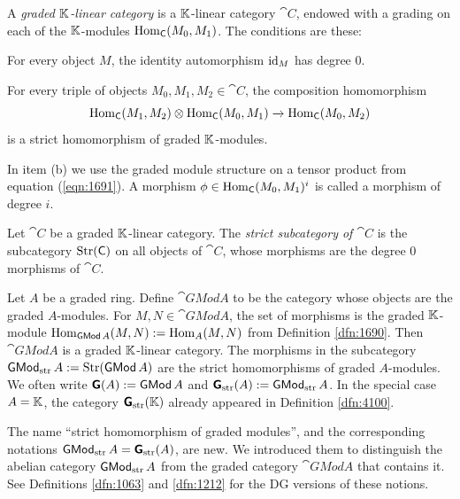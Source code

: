 \begin{dfn} \label{dfn:1692}
A {\em graded $\mathbb{K}$-linear category}%
is a $\mathbb{K}$-linear category $\cat{C}$, 
endowed with a grading on each of the $\mathbb{K}$-modules 
$\operatorname{Hom}_{\operatorname{\mathsf{C}}}(M_0, M_1)$. The conditions are these:
\begin{enumerate}
 For every object $M$, the identity automorphism $\operatorname{id}_M$ has 
degree $0$. 

 For every triple of objects $M_0, M_1, M_2 \in \cat{C}$, the 
composition homomorphism 
\[ \operatorname{Hom}_{\operatorname{\mathsf{C}}}(M_1, M_2) \otimes \operatorname{Hom}_{\operatorname{\mathsf{C}}}(M_0, M_1)
\xrightarrow{} \operatorname{Hom}_{\operatorname{\mathsf{C}}}(M_0, M_2) \]
is a strict homomorphism of graded $\mathbb{K}$-modules. 
\end{enumerate}
\end{dfn}

In item (b) we use the graded module structure on a tensor product from 
equation (\ref{eqn:1691}).
A morphism $\phi \in \operatorname{Hom}_{\operatorname{\mathsf{C}}}(M_0, M_1)^i$ is called a 
morphism of degree $i$. 
 
\begin{dfn} \label{dfn:1693} 
Let $\cat{C}$ be a graded $\mathbb{K}$-linear category.
The {\em strict subcategory of $\cat{C}$}%
is the subcategory $\operatorname{Str}(\operatorname{\mathsf{C}})$ on all objects of $\cat{C}$, whose 
morphisms are the degree $0$ morphisms of $\cat{C}$.
\end{dfn}

\begin{exa} \label{exa:1696}
Let $A$ be a graded ring. Define $\cat{GMod} A$ to be 
the category whose objects are the graded $A$-modules. For 
$M, N \in \cat{GMod} A$, the set of morphisms is the graded $\mathbb{K}$-module 
$\operatorname{Hom}_{\operatorname{\mathsf{GMod}} A}(M, N) := \operatorname{Hom}_{A}(M, N)$ 
from Definition \ref{dfn:1690}. Then $\cat{GMod} A$ is a graded $\mathbb{K}$-linear 
category. The morphisms in the subcategory
$\operatorname{\mathsf{GMod}}_{\mathrm{str}} A := \operatorname{Str}(\operatorname{\mathsf{GMod}} A)$ are the 
strict homomorphisms of graded $A$-modules.
We often write
$\boldsymbol{\mathsf{G}}(A) := \operatorname{\mathsf{GMod}} A$ and 
$\boldsymbol{\mathsf{G}}_{\mathrm{str}}(A) := \operatorname{\mathsf{GMod}}_{\mathrm{str}} A$.  
In the special case $A = \mathbb{K}$, the category $\boldsymbol{\mathsf{G}}_{\mathrm{str}}(\mathbb{K})$
already appeared in Definition \ref{dfn:4100}. 
\end{exa}

\begin{rem} \label{rem:1190}
The name ``strict homomorphism of graded modules'', and the corresponding 
notations $\operatorname{\mathsf{GMod}}_{\mathrm{str}} A = \boldsymbol{\mathsf{G}}_{\mathrm{str}}(A)$, 
are new. We introduced them to distinguish the 
abelian category $\operatorname{\mathsf{GMod}}_{\mathrm{str}} A$ from the graded category 
$\cat{GMod} A$ that contains it.
See Definitions \ref{dfn:1063} and
\ref{dfn:1212} for the DG versions of these notions.
\end{rem}

